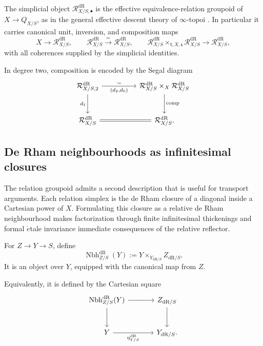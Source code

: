 \begin{proposition}
The simplicial object \(\mathcal R^{\mathrm{dR}}_{X/S,\bullet}\) is the effective
equivalence-relation groupoid of \(X\to Q_{X/S}\), as in the general effective
descent theory of \(\infty\)-topoi \cite{LurieHigherToposTheory}. In particular it carries
canonical unit, inversion,
and composition maps
\[
  X\longrightarrow \mathcal R^{\mathrm{dR}}_{X/S},
  \qquad
  \mathcal R^{\mathrm{dR}}_{X/S}\xrightarrow{\simeq}\mathcal R^{\mathrm{dR}}_{X/S},
  \qquad
  \mathcal R^{\mathrm{dR}}_{X/S}\times_{\mathsf t,X,\mathsf s}\mathcal R^{\mathrm{dR}}_{X/S}
  \longrightarrow \mathcal R^{\mathrm{dR}}_{X/S},
\]
with all coherences supplied by the simplicial identities.

In degree two, composition is encoded by the Segal diagram
\[
\begin{tikzcd}[column sep=huge,row sep=large]
  \mathcal R^{\mathrm{dR}}_{X/S,2}
    \arrow[r,"\sim","{(d_2,d_0)}"']
    \arrow[d,"d_1"']
  &
  \mathcal R^{\mathrm{dR}}_{X/S}
    \times_X
  \mathcal R^{\mathrm{dR}}_{X/S}
    \arrow[d,"\mathrm{comp}"]
  \\
  \mathcal R^{\mathrm{dR}}_{X/S}
    \arrow[r,equal]
  &
  \mathcal R^{\mathrm{dR}}_{X/S}.
\end{tikzcd}
\]
\end{proposition}

\subsection{De Rham neighbourhoods as infinitesimal closures}
\label{sec:de-Rham-neighbourhoods}

The relation groupoid admits a second description that is useful for
transport arguments. Each relation simplex is the de Rham closure of a
diagonal inside a Cartesian power of \(X\). Formulating this closure as a
relative de Rham neighbourhood makes factorization through finite
infinitesimal thickenings and formal \(\acute{e}\)tale invariance immediate
consequences of the relative reflector.

\begin{definition}
For \(Z\to Y\to S\), define
\[
  \operatorname{Nbh}^{\mathrm{dR}}_{Z/S}(Y)
  :=
  Y\times_{Y_{\mathrm{dR}/S}}Z_{\mathrm{dR}/S}.
\]
It is an object over \(Y\), equipped with the canonical map from \(Z\).

Equivalently, it is defined by the Cartesian square
\[
\begin{tikzcd}[column sep=large,row sep=large]
  \operatorname{Nbh}^{\mathrm{dR}}_{Z/S}(Y)
    \arrow[r]
    \arrow[d]
  &
  Z_{\mathrm{dR}/S}
    \arrow[d]
  \\
  Y
    \arrow[r,"\eta_{Y/S}^{\mathrm{dR}}"']
  &
  Y_{\mathrm{dR}/S}.
\end{tikzcd}
\]

\end{definition}


